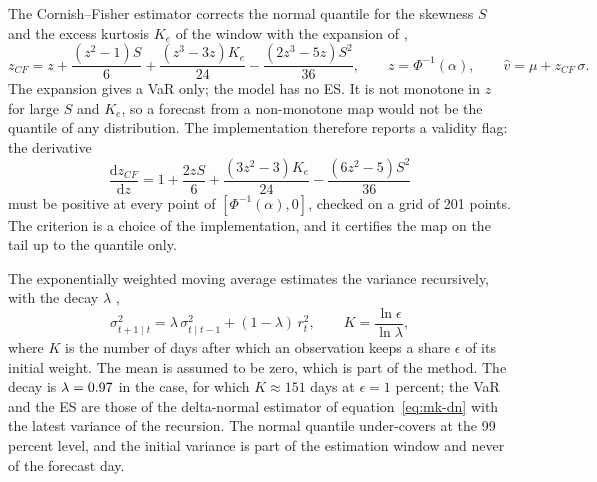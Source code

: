The Cornish--Fisher estimator corrects the normal quantile for the skewness $S$ and the excess kurtosis $K_e$ of the window with the
expansion of \citet{market:cornishfisher1938},
\begin{equation}
z_{CF}=z+\frac{(z^2-1)S}{6}+\frac{(z^3-3z)K_e}{24}-\frac{(2z^3-5z)S^2}{36},\qquad z=\Phi^{-1}(\alpha),\qquad\widehat v=\mu+z_{CF}\,\sigma.
\label{eq:mk-cf}
\end{equation}
The expansion gives a VaR only; the model has no ES. It is not monotone in $z$ for large $S$ and $K_e$, so a forecast from a
non-monotone map would not be the quantile of any distribution. The implementation therefore reports a validity flag: the derivative
\begin{equation}
\frac{\mathrm d z_{CF}}{\mathrm d z}=1+\frac{2zS}{6}+\frac{(3z^2-3)K_e}{24}-\frac{(6z^2-5)S^2}{36}
\label{eq:mk-cf-deriv}
\end{equation}
must be positive at every point of $[\Phi^{-1}(\alpha),0]$, checked on a grid of 201 points. The criterion is a choice of the
implementation, and it certifies the map on the tail up to the quantile only.

The exponentially weighted moving average estimates the variance recursively, with the decay $\lambda$ \citep{market:riskmetrics1996},
\begin{equation}
\sigma^2_{t+1\mid t}=\lambda\,\sigma^2_{t\mid t-1}+(1-\lambda)\,r_t^2,\qquad K=\frac{\ln\epsilon}{\ln\lambda},
\label{eq:mk-ewma}
\end{equation}
where $K$ is the number of days after which an observation keeps a share $\epsilon$ of its initial weight. The mean is assumed to be
zero, which is part of the method. The decay is $\lambda=0.97{}$ in the case, for which $K\approx151$ days at $\epsilon=1$
percent; the VaR and the ES are those of the delta-normal estimator of equation~\eqref{eq:mk-dn} with the latest variance of the
recursion. The normal quantile under-covers at the 99 percent level, and the initial variance is part of the estimation window and
never of the forecast day.

